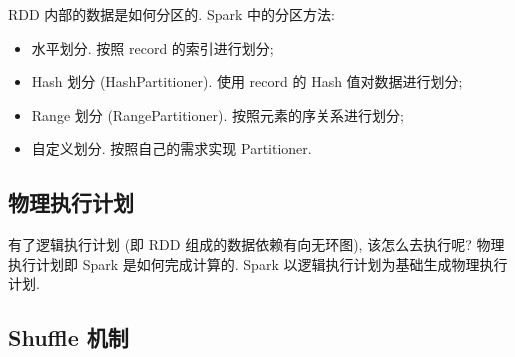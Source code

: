 RDD 内部的数据是如何分区的. Spark 中的分区方法:

\begin{itemize}
	\item 水平划分. 按照 record 的索引进行划分;
	
	\item Hash 划分 (HashPartitioner). 使用 record 的 Hash 值对数据进行划分;
	
	\item Range 划分 (RangePartitioner). 按照元素的序关系进行划分;
	
	\item 自定义划分. 按照自己的需求实现 Partitioner.
\end{itemize}



\subsection{物理执行计划}

有了逻辑执行计划 (即 RDD 组成的数据依赖有向无环图), 该怎么去执行呢? 物理执行计划即 Spark 是如何完成计算的. Spark 以逻辑执行计划为基础生成物理执行计划. 

\subsection{Shuffle 机制}